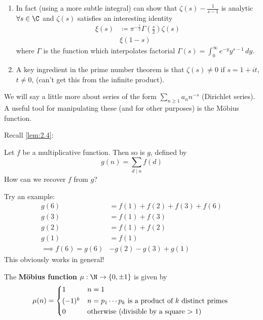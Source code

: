 \documentclass{article}
\newenvironment{manual}[1]{%
    \renewcommand\themanualinner{#1}%
    \manualinner
}{\endmanualinner}
\begin{document}
\begin{remark}
    \begin{enumerate}[label=(\roman*)]
        \item In fact (using a more subtle integral) can show that $\zeta(s) - \frac{1}{s-1}$ is analytic $\forall s \in \C$ and $\zeta(s)$ satisfies an interesting identity
            \begin{align*}
                \xi(s) &\coloneqq \pi^{-\frac{s}{2}} \Gamma(\frac{s}{2}) \zeta(s) \\
                       &\xi(1-s)
            \end{align*}
            where $\Gamma$ is the function which interpolates factorial $\Gamma(s) = \int_0^\infty e^{-y} y^{s-1} \, dy$.
        \item A key ingredient in the prime number theorem is that $\zeta(s) \neq 0$ if $s = 1 + it$, $t \neq 0$, (can't get this from the infinite product).
    \end{enumerate}
\end{remark}

We will say a little more about series of the form $\sum_{n \geq 1} a_n n^{-s}$ (Dirichlet series).
A useful tool for manipulating these (and for other purposes) is the M\"obius function.

Recall \cref{lem:2.4}:
\begin{manual}{Lemma 2.4}
    Let $f$ be a multiplicative function. Then so is $g$, defined by \begin{equation*} g(n) = \sum_{d \mid n} f(d) \end{equation*}
\end{manual}
How can we recover $f$ from $g$?
\begin{eg}
    Try an example:
    \begin{align*}
        g(6) &= f(1) + f(2) + f(3) + f(6) \\
        g(3) &= f(1) + f(3) \\
        g(2) &= f(1) + f(2) \\
        g(1) &= f(1) \\
        \implies f(6) = g(6) &- g(2) - g(3) + g(1)
    \end{align*}
    This obviously works in general!
\end{eg}

\begin{defi}
    The \textbf{M\"obius function} $\mu: \N \to \{0, \pm 1\}$ is given by
    \begin{align*}
        \mu(n) =
        \begin{cases*}
            1 & $n = 1$ \\
            (-1)^k & $n = p_1 \dotsm p_k$ is a product of $k$ distinct primes \\
            0 & otherwise (divisible by a square > 1)
        \end{cases*}
    \end{align*}
\end{defi}
\end{document}
